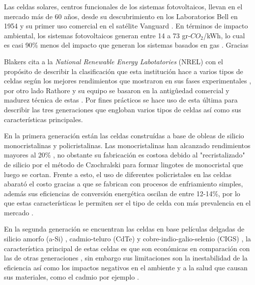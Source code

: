 Las celdas solares, centros funcionales de los sistemas fotovoltaicos, llevan en el mercado más de 60 años, desde su descubrimiento en los  Laboratorios Bell en 1954 \cite{green2009path} y su primer uso comercial en el satélite Vanguard \cite{singh2013solar}. En términos de impacto ambiental, los sistemas fotovoltaicos generan entre 14 a 73 gr-$CO_2$/kWh, lo cual es casi 90\% menos del impacto que generan los sistemas basados en gas \cite{tawalbeh2021environmental}. Gracias 

Blakers cita a la 
\textit{National Renewable Energy Labotatories} (NREL) con el propósito de describir la clasificación que esta institución hace a varios tipos de celdas  según los mejores rendimientos que mostraron en sus fases experimentales \cite{blakers2013}, por otro lado Rathore y su equipo se basaron en la antigûedad comercial y madurez técnica de estas \cite{rathore2021}. Por fines prácticos se hace uso de esta última para describir las tres generaciones que engloban varios tipos de celdas así como sus características principales. 

En la primera generación están las celdas construídas a base de obleas de silicio monocristalinas y policristalinas. Las monocristalinas han alcanzado rendimientos mayores al 20\% \cite{gul2016}, no obstante su fabricación es costosa  \cite{srinivas2015review} debido al "recristalizado" de silicio por el método de Czochralski \cite{yu2019growth} para formar lingotes de monocristal que luego se cortan. Frente a esto, el uso de diferentes policristales en las celdas abarató el costo gracias a que se fabrican con procesos de enfriamiento simples, además sus eficiencias de conversión energética oscilan de entre 12-14\%, por lo que estas características le permiten ser el tipo de celda con más prevalencia en el mercado \cite{sharma2015solar}. 

En la segunda generación se encuentran las celdas en base películas delgadas de silicio amorfo (a-Si) \cite{kaur2016review}, cadmio-teluro (CdTe) \cite{bertolli2008} y cobre-indio-galio-selenio (CIGS) \cite{bagher2015types}, la característica principal de estas celdas es que son económicas en comparación con las de otras generaciones \cite{rathore2021}, sin embargo sus limitaciones son la inestabilidad de la eficiencia \cite{gul2016review} así como los impactos negativos en el ambiente y a la salud que causan sus materiales, como el cadmio por ejemplo \cite{bagher2015types}. 


